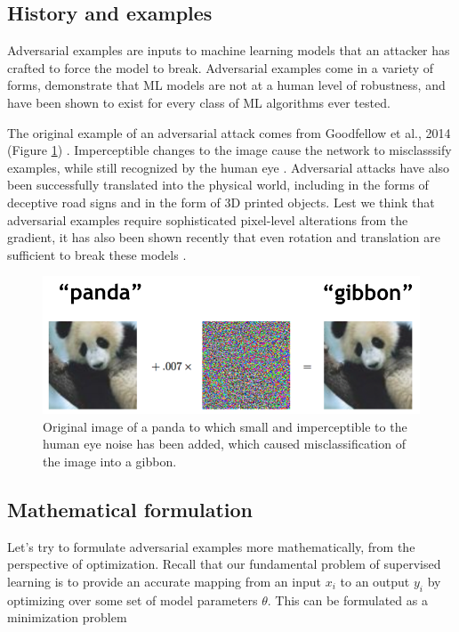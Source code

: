 \documentclass[10pt]{article}
\begin{document}
\subsection{History and examples}

Adversarial examples are inputs to machine learning models that an attacker has crafted to force the model to break. Adversarial examples come in a variety of forms, demonstrate that ML models are not at a human level of robustness, and have been shown to exist for every class of ML algorithms ever tested.

The original example of an adversarial attack comes from Goodfellow et al., 2014 (Figure \ref{fig:panda}) \cite{goodfellow2014}. Imperceptible changes to the image cause the network to misclasssify examples, while still recognized by the human eye \cite{Szegedy2013}. 
Adversarial attacks have also been successfully translated into the physical world, including in the forms of deceptive road signs 
and in the form of 3D printed objects. Lest we think that adversarial examples require sophisticated pixel-level alterations from the gradient, it has also been shown recently that even rotation and translation are sufficient to break these models \cite{Engstrom2017}.


\begin{figure}[!h]
\centering
\includegraphics[width=0.6\linewidth]{panda}
\caption{Original image of a panda to which small and imperceptible to the human eye noise has been added, which caused misclassification of the image into a gibbon.}
\label{fig:panda}
\end{figure}

\subsection{Mathematical formulation}

Let's try to formulate adversarial examples more mathematically, from the perspective of optimization. Recall that our fundamental problem of supervised learning is to provide an accurate mapping from an input $x_i$ to an output $y_i$ by optimizing over some set of model parameters $\theta$. This can be formulated as a minimization problem
\end{document}
